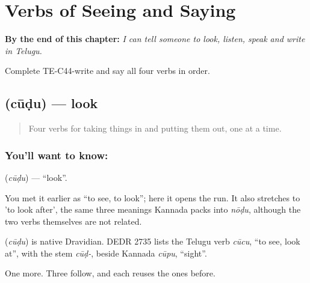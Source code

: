 
\chapter{Verbs of Seeing and Saying}
\label{ch:te-see-say}

\begin{chapteropening}
\textbf{By the end of this chapter:} \emph{I can tell someone to look, listen, speak and write in Telugu.}

Complete TE-C44-write and say all four verbs in order.
\end{chapteropening}

\section[\texorpdfstring{\te{చూడు} (cūḍu)}{చూడు (cūḍu)}]{ (cūḍu) — look}

\label{lesson:TE-C44-look}



\begin{quote}
Four verbs for taking things in and putting them out, one at a time.
\end{quote}

\subsection*{You'll want to know: }
\textbf{} (\emph{cūḍu}) — \textquotedblleft{}look\textquotedblright{}.

You met it earlier as \textquotedblleft{}to see, to look\textquotedblright{}; here it opens the run. It also stretches to 'to look after', the same three meanings Kannada packs into \emph{nōḍu}, although the two verbs themselves are not related.

\begin{cousinweb}
\textbf{} (\emph{cūḍu}) is native Dravidian. DEDR 2735 lists the Telugu verb \emph{cūcu}, \textquotedblleft{}to see, look at\textquotedblright{}, with the stem \emph{cūḍ-}, beside Kannada \emph{cūpu}, \textquotedblleft{}sight\textquotedblright{}.
\end{cousinweb}

\begin{grammarlens}[title={What you've built}]
One more. Three follow, and each reuses the ones before.
\end{grammarlens}

